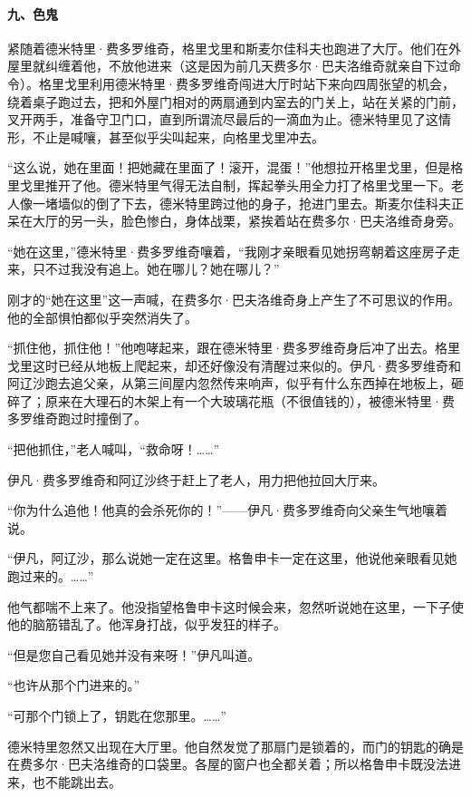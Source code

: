 \paragraph*{九、色鬼}
\par 紧随着德米特里·费多罗维奇，格里戈里和斯麦尔佳科夫也跑进了大厅。他们在外屋里就纠缠着他，不放他进来（这是因为前几天费多尔·巴夫洛维奇就亲自下过命令）。格里戈里利用德米特里·费多罗维奇闯进大厅时站下来向四周张望的机会，绕着桌子跑过去，把和外屋门相对的两扇通到内室去的门关上，站在关紧的门前，叉开两手，准备守卫门口，直到所谓流尽最后的一滴血为止。德米特里见了这情形，不止是喊嚷，甚至似乎尖叫起来，向格里戈里冲去。
\par “这么说，她在里面！把她藏在里面了！滚开，混蛋！”他想拉开格里戈里，但是格里戈里推开了他。德米特里气得无法自制，挥起拳头用全力打了格里戈里一下。老人像一堵墙似的倒了下去，德米特里跨过他的身子，抢进门里去。斯麦尔佳科夫正呆在大厅的另一头，脸色惨白，身体战栗，紧挨着站在费多尔·巴夫洛维奇身旁。
\par “她在这里，”德米特里·费多罗维奇嚷着，“我刚才亲眼看见她拐弯朝着这座房子走来，只不过我没有追上。她在哪儿？她在哪儿？”
\par 刚才的“她在这里”这一声喊，在费多尔·巴夫洛维奇身上产生了不可思议的作用。他的全部惧怕都似乎突然消失了。
\par “抓住他，抓住他！”他咆哮起来，跟在德米特里·费多罗维奇身后冲了出去。格里戈里这时已经从地板上爬起来，却还好像没有清醒过来似的。伊凡·费多罗维奇和阿辽沙跑去追父亲，从第三间屋内忽然传来响声，似乎有什么东西掉在地板上，砸碎了；原来在大理石的木架上有一个大玻璃花瓶（不很值钱的），被德米特里·费多罗维奇跑过时撞倒了。
\par “把他抓住，”老人喊叫，“救命呀！……”
\par 伊凡·费多罗维奇和阿辽沙终于赶上了老人，用力把他拉回大厅来。
\par “你为什么追他！他真的会杀死你的！”——伊凡·费多罗维奇向父亲生气地嚷着说。
\par “伊凡，阿辽沙，那么说她一定在这里。格鲁申卡一定在这里，他说他亲眼看见她跑过来的。……”
\par 他气都喘不上来了。他没指望格鲁申卡这时候会来，忽然听说她在这里，一下子使他的脑筋错乱了。他浑身打战，似乎发狂的样子。
\par “但是您自己看见她并没有来呀！”伊凡叫道。
\par “也许从那个门进来的。”
\par “可那个门锁上了，钥匙在您那里。……”
\par 德米特里忽然又出现在大厅里。他自然发觉了那扇门是锁着的，而门的钥匙的确是在费多尔·巴夫洛维奇的口袋里。各屋的窗户也全都关着；所以格鲁申卡既没法进来，也不能跳出去。
